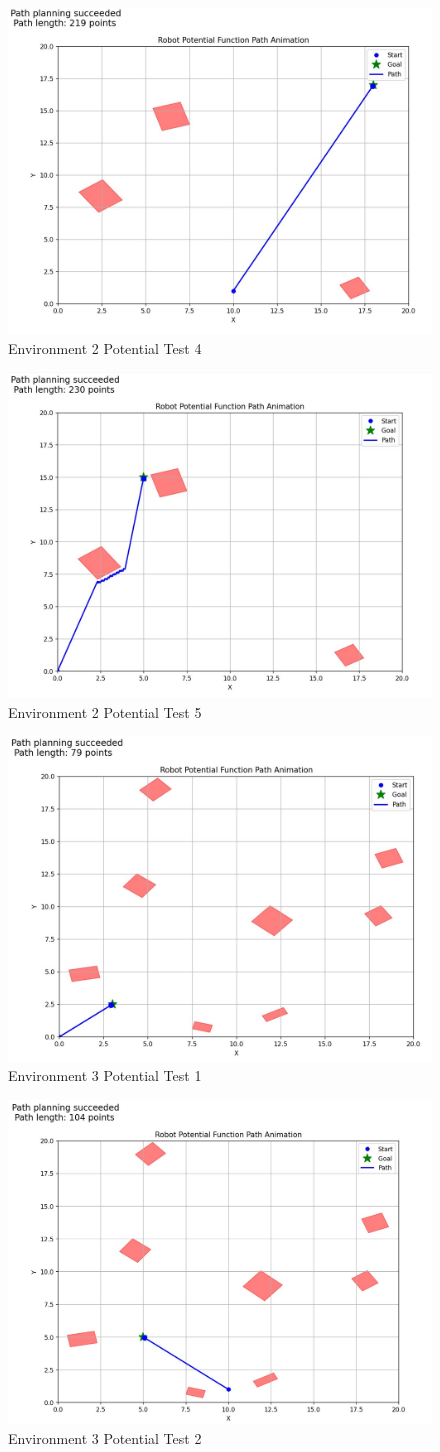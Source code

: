 \documentclass{article}
\begin{document}
\begin{figure} [H]
    \centering
    \includegraphics[width=0.5\linewidth]{latex_media/Env2PotentialTest4.jpg}
    \caption{Environment 2 Potential Test 4}
\end{figure}

\begin{figure} [H]
    \centering
    \includegraphics[width=0.5\linewidth]{latex_media/Env2PotentialTest5.jpg}
    \caption{Environment 2 Potential Test 5}
\end{figure}

\begin{figure} [H]
    \centering
    \includegraphics[width=0.5\linewidth]{latex_media/Env3PotentialTest1.jpg}
    \caption{Environment 3 Potential Test 1}
\end{figure}

\begin{figure} [H]
    \centering
    \includegraphics[width=0.5\linewidth]{latex_media/Env3PotentialTest2.jpg}
    \caption{Environment 3 Potential Test 2}
\end{figure}
\end{document}
